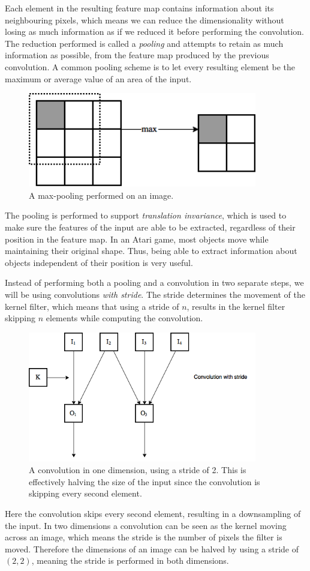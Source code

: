 \documentclass[11pt]{article}
\begin{document}
Each element in the resulting feature map contains information about
its neighbouring pixels, which means we can reduce the dimensionality
without losing as much information as if we reduced it before performing the convolution.
The reduction performed is called a \textit{pooling} and attempts to retain
as much information as possible, from the feature map produced by the previous convolution. 
A common pooling scheme is to let every resulting element be the maximum
or average value of an area of the input.
\begin{figure}[H]
    \centering
    \includegraphics[width=10cm]{include/pooling.png}
    \caption{A max-pooling performed on an image.}
\end{figure}
The pooling is performed to support \textit{translation invariance},
which is used to make sure the features of the input are able to
be extracted, regardless of their position in the feature map.
In an Atari game, most objects move while maintaining their original shape.
Thus, being able to
extract information about objects independent of their position is very useful.

Instead of performing both a pooling and a convolution in two separate steps,
we will be using convolutions \textit{with stride}.
The stride determines the movement of the kernel filter, which means that
using a stride of $n$, results in the kernel filter skipping $n$ elements 
while computing the convolution.
\begin{figure}[!h]\label{con2}
    \centering
    \includegraphics[width=10cm]{include/strides.png}
    \caption{A convolution in one dimension, using a stride of 2.
             This is effectively halving the size of the input since
             the convolution is skipping every second element.}
    \label{fig:conv}
\end{figure}
Here the convolution skips every second element, resulting in a downsampling
of the input.
In two dimensions a convolution can be seen as the kernel moving across
an image, which means the stride is the number of pixels the filter is moved.
Therefore the dimensions of an image can be halved by using a stride of $(2, 2)$, meaning
the stride is performed in both dimensions.
\end{document}
